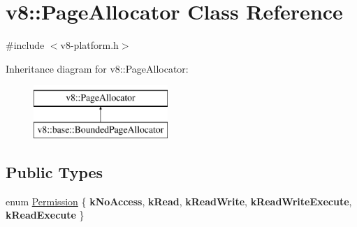 \hypertarget{classv8_1_1PageAllocator}{}\section{v8\+:\+:Page\+Allocator Class Reference}
\label{classv8_1_1PageAllocator}


{\ttfamily \#include $<$v8-\/platform.\+h$>$}

Inheritance diagram for v8\+:\+:Page\+Allocator\+:\begin{figure}[H]
\begin{center}
\leavevmode
\includegraphics[height=2.000000cm]{classv8_1_1PageAllocator}
\end{center}
\end{figure}
\subsection*{Public Types}
\begin{DoxyCompactItemize}
\item 
enum \mbox{\hyperlink{classv8_1_1PageAllocator_a88f74b164fe97e053259f67a95758415}{Permission}} \{ \newline
{\bfseries k\+No\+Access}, 
{\bfseries k\+Read}, 
{\bfseries k\+Read\+Write}, 
{\bfseries k\+Read\+Write\+Execute}, 
\newline
{\bfseries k\+Read\+Execute}
 \}
\end{DoxyCompactItemize}
